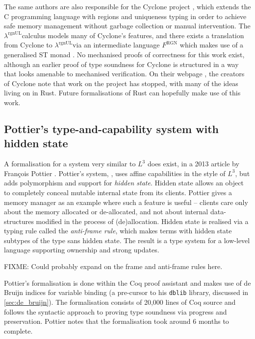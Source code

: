 \documentclass[]{unswthesis}
\newcommand{\rgnUL}{$\lambda^\text{rgnUL}$\text{ }}
\newcommand{\SSPHS}{\text{SSPHS }}
\begin{document}
The same authors are also responsible for the Cyclone project \cite{grossman05}, which extends the C programming language with regions and uniqueness typing in order to achieve safe memory management without garbage collection or manual intervention. The \rgnUL calculus models many of Cyclone's features, and there exists a translation from Cyclone to \rgnUL via an intermediate language $F^\text{RGN}$ which makes use of a generalised ST monad \cite{fluet04}. No mechanised proofs of correctness for this work exist, although an earlier proof of type soundness for Cyclone \cite{jim01} is structured in a way that looks amenable to mechanised verification. On their webpage \cite{cycloneWeb}, the creators of Cyclone note that work on the project has stopped, with many of the ideas living on in Rust. Future formalisations of Rust can hopefully make use of this work.

\subsection{Pottier's type-and-capability system with hidden state}

A formalisation for a system very similar to $L^3$ does exist, in a 2013 article by Fran\c{c}ois Pottier \cite{pottier13}. Pottier's system, \SSPHS, uses affine capabilities in the style of $L^3$, but adds polymorphism and support for \textit{hidden state}. Hidden state allows an object to completely conceal mutable internal state from its clients. Pottier gives a memory manager as an example where such a feature is useful -- clients care only about the memory allocated or de-allocated, and not about internal data-structures modified in the process of (de)allocation. Hidden state is realised via a typing rule called the \textit{anti-frame rule}, which makes terms with hidden state subtypes of the type sans hidden state. The result is a type system for a low-level language supporting ownership and strong updates.

FIXME: Could probably expand on the frame and anti-frame rules here.

Pottier's formalisation is done within the Coq proof assistant and makes use of de Bruijn indices for variable binding (a pre-cursor to his \texttt{dblib} library, discussed in \ref{sec:de_bruijn}). The formalisation consists of 20,000 lines of Coq source and follows the syntactic approach to proving type soundness via progress and preservation. Pottier notes that the formalisation took around 6 months to complete.
\end{document}
